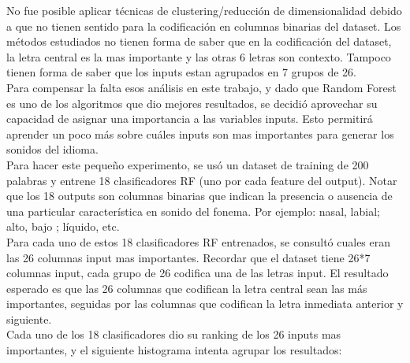 \documentclass[paper=a4, fontsize=11pt]{scrartcl} %
\numberwithin{equation}{section} %
\numberwithin{figure}{section} %
\numberwithin{table}{section} %
\begin{document}
No fue posible aplicar técnicas de clustering/reducción de dimensionalidad debido a que no tienen sentido para la codificación en columnas binarias del dataset. Los métodos estudiados no tienen forma de saber que en la codificación del dataset, la letra central es la mas importante y las otras 6 letras son contexto. Tampoco tienen forma de saber que los inputs estan agrupados en 7 grupos de 26. \\

Para compensar la falta esos análisis en este trabajo, y dado que Random Forest es uno de los algoritmos que dio mejores resultados, se decidió aprovechar su capacidad de asignar una importancia a las variables inputs. Esto  permitirá aprender un poco más sobre cuáles inputs son mas importantes para generar los sonidos del idioma. \\

Para hacer este pequeño experimento, se usó un dataset de training de 200 palabras y entrene 18 clasificadores RF (uno por cada feature del output). Notar que los 18 outputs son columnas binarias que indican la presencia o ausencia de una particular característica en sonido del fonema. Por ejemplo: nasal, labial; alto, bajo ; líquido, etc. \\

Para cada uno de estos 18 clasificadores RF entrenados, se consultó cuales eran las 26 columnas input mas importantes. Recordar que el dataset tiene 26*7 columnas input, cada grupo de 26 codifica una de las letras input. El resultado esperado es que las 26 columnas que codifican la letra central sean las más importantes, seguidas por las columnas que codifican la letra inmediata anterior y siguiente. \\

Cada uno de los 18 clasificadores dio su ranking de los 26 inputs mas importantes, y el siguiente histograma intenta agrupar los resultados:
\end{document}
